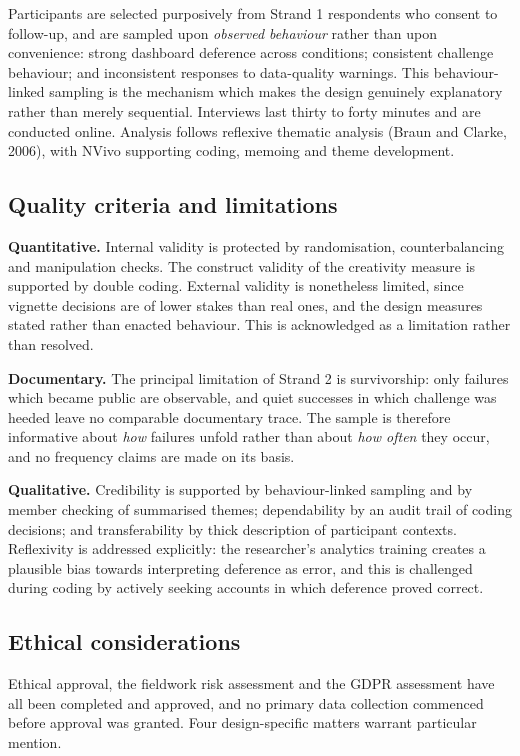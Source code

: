 \documentclass[11pt,a4paper]{article}
\numberwithin{figure}{section}
\numberwithin{table}{section}
\newcommand{\ct}[1]{\textcolor{citeblue}{#1}}          %
\begin{document}
Participants are selected purposively from Strand 1 respondents who consent to follow-up, and are
sampled upon \emph{observed behaviour} rather than upon convenience: strong dashboard deference
across conditions; consistent challenge behaviour; and inconsistent responses to data-quality
warnings. This behaviour-linked sampling is the mechanism which makes the design genuinely
explanatory rather than merely sequential. Interviews last thirty to forty minutes and are
conducted online. Analysis follows reflexive thematic analysis \ct{(Braun and Clarke, 2006)}, with
NVivo supporting coding, memoing and theme development.

\subsection{Quality criteria and limitations}

\textbf{Quantitative.} Internal validity is protected by randomisation, counterbalancing and
manipulation checks. The construct validity of the creativity measure is supported by double
coding. External validity is nonetheless limited, since vignette decisions are of lower stakes than
real ones, and the design measures stated rather than enacted behaviour. This is acknowledged as a
limitation rather than resolved.

\textbf{Documentary.} The principal limitation of Strand 2 is survivorship: only failures which
became public are observable, and quiet successes in which challenge was heeded leave no comparable
documentary trace. The sample is therefore informative about \emph{how} failures unfold rather than
about \emph{how often} they occur, and no frequency claims are made on its basis.

\textbf{Qualitative.} Credibility is supported by behaviour-linked sampling and by member checking
of summarised themes; dependability by an audit trail of coding decisions; and transferability by
thick description of participant contexts. Reflexivity is addressed explicitly: the researcher's
analytics training creates a plausible bias towards interpreting deference as error, and this is
challenged during coding by actively seeking accounts in which deference proved correct.

\subsection{Ethical considerations}

Ethical approval, the fieldwork risk assessment and the GDPR assessment have all been completed and
approved, and no primary data collection commenced before approval was granted. Four
design-specific matters warrant particular mention.
\end{document}
